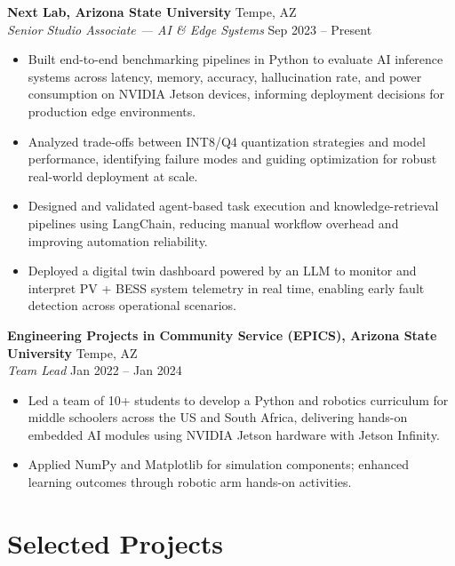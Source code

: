 \documentclass[10pt, letterpaper]{article}
\newcommand{\role}[2]{%
  \textit{#1} \hfill #2 \\[-2pt]%
}
\begin{document}
\vspace{6pt}

\textbf{Next Lab, Arizona State University} \hfill Tempe, AZ \\
\role{Senior Studio Associate --- AI \& Edge Systems}{Sep 2023 -- Present}
\begin{itemize}
  \item Built end-to-end benchmarking pipelines in Python to evaluate AI inference systems across
    latency, memory, accuracy, hallucination rate, and power consumption on NVIDIA Jetson devices,
    informing deployment decisions for production edge environments.
  \item Analyzed trade-offs between INT8/Q4 quantization strategies and model performance,
    identifying failure modes and guiding optimization for robust real-world deployment at scale.
  \item Designed and validated agent-based task execution and knowledge-retrieval pipelines using
    LangChain, reducing manual workflow overhead and improving automation reliability.
  \item Deployed a digital twin dashboard powered by an LLM to monitor and interpret PV + BESS
    system telemetry in real time, enabling early fault detection across operational scenarios.
\end{itemize}

\vspace{6pt}

\textbf{Engineering Projects in Community Service (EPICS), Arizona State University} \hfill Tempe, AZ \\
\role{Team Lead}{Jan 2022 -- Jan 2024}
\begin{itemize}
  \item Led a team of 10+ students to develop a Python and robotics curriculum for middle
    schoolers across the US and South Africa, delivering hands-on embedded AI modules using
    NVIDIA Jetson hardware with Jetson Infinity.
  \item Applied NumPy and Matplotlib for simulation components; enhanced learning outcomes through
    robotic arm hands-on activities.
\end{itemize}

\section*{Selected Projects}
\end{document}
